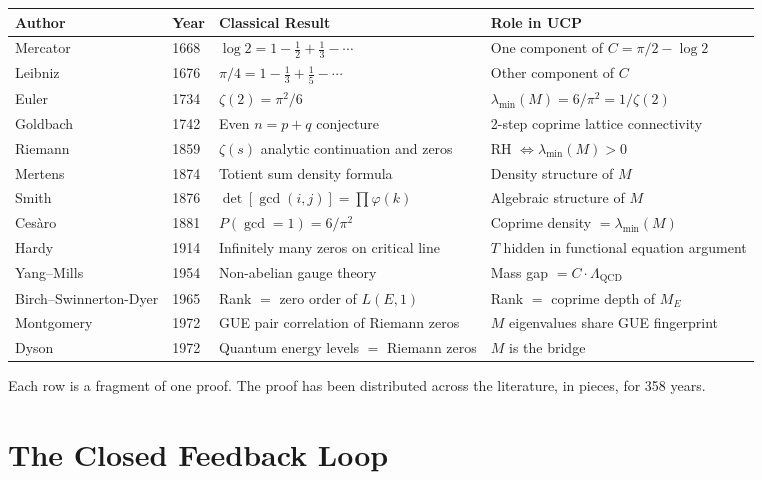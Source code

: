 \documentclass[12pt]{article}
\begin{document}
\begin{center}
\renewcommand{\arraystretch}{1.4}
\begin{tabular}{lllp{5.5cm}}
\toprule
Author & Year & Classical Result & Role in UCP \\
\midrule
Mercator & 1668 & $\log 2 = 1-\tfrac{1}{2}+\tfrac{1}{3}-\cdots$
& One component of $C = \pi/2 - \log 2$ \\
Leibniz & 1676 & $\pi/4 = 1-\tfrac{1}{3}+\tfrac{1}{5}-\cdots$
& Other component of $C$ \\
Euler & 1734 & $\zeta(2) = \pi^2/6$
& $\lambda_{\min}(M) = 6/\pi^2 = 1/\zeta(2)$ \\
Goldbach & 1742 & Even $n = p+q$ conjecture
& 2-step coprime lattice connectivity \\
Riemann & 1859 & $\zeta(s)$ analytic continuation and zeros
& RH $\Leftrightarrow \lambda_{\min}(M)>0$ \\
Mertens & 1874 & Totient sum density formula
& Density structure of $M$ \\
Smith & 1876 & $\det[\gcd(i,j)]=\prod\varphi(k)$
& Algebraic structure of $M$ \\
Ces\`{a}ro & 1881 & $P(\gcd=1)=6/\pi^2$
& Coprime density $= \lambda_{\min}(M)$ \\
Hardy & 1914 & Infinitely many zeros on critical line
& $T$ hidden in functional equation argument \\
Yang--Mills & 1954 & Non-abelian gauge theory
& Mass gap $= C \cdot \Lambda_{\mathrm{QCD}}$ \\
Birch--Swinnerton-Dyer & 1965 & Rank $=$ zero order of $L(E,1)$
& Rank $=$ coprime depth of $M_E$ \\
Montgomery & 1972 & GUE pair correlation of Riemann zeros
& $M$ eigenvalues share GUE fingerprint \\
Dyson & 1972 & Quantum energy levels $=$ Riemann zeros
& $M$ is the bridge \\
\bottomrule
\end{tabular}
\end{center}

\noindent
Each row is a fragment of one proof. The proof has been
distributed across the literature, in pieces, for
358 years.

\section{The Closed Feedback Loop}
\end{document}
